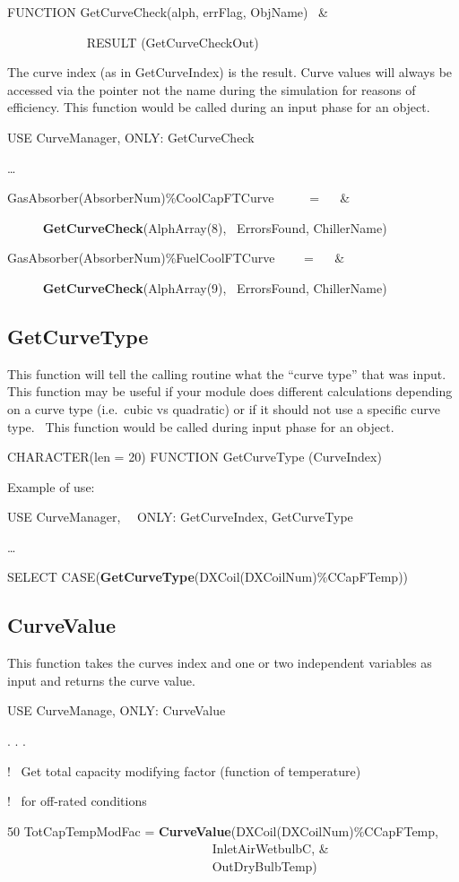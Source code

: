 FUNCTION GetCurveCheck(alph, errFlag, ObjName)~ \&

~~~~~~~~~~~~ RESULT (GetCurveCheckOut)

The curve index (as in GetCurveIndex) is the result. Curve values will always be accessed via the pointer not the name during the simulation for reasons of efficiency. This function would be called during an input phase for an object.

USE CurveManager, ONLY: GetCurveCheck

\ldots{}

GasAbsorber(AbsorberNum)\%CoolCapFTCurve~~~~~ = ~~ \&

~~~~~ \textbf{GetCurveCheck}(AlphArray(8),~ ErrorsFound, ChillerName)

GasAbsorber(AbsorberNum)\%FuelCoolFTCurve~~~~ = ~~ \&

~~~~~ \textbf{GetCurveCheck}(AlphArray(9),~ ErrorsFound, ChillerName)

\subsection{GetCurveType}\label{getcurvetype}

This function will tell the calling routine what the ``curve type'' that was input.~ This function may be useful if your module does different calculations depending on a curve type (i.e.~cubic vs quadratic) or if it should not use a specific curve type.~ This function would be called during input phase for an object.

CHARACTER(len = 20) FUNCTION GetCurveType (CurveIndex)

Example of use:

USE CurveManager,~~ ONLY: GetCurveIndex, GetCurveType

\ldots{}

SELECT CASE(\textbf{GetCurveType}(DXCoil(DXCoilNum)\%CCapFTemp))

\subsection{CurveValue}\label{curvevalue}

This function takes the curves index and one or two independent variables as input and returns the curve value.

USE CurveManage, ONLY: CurveValue

. . .

!~ Get total capacity modifying factor (function of temperature)

!~ for off-rated conditions

50 TotCapTempModFac = \textbf{CurveValue}(DXCoil(DXCoilNum)\%CCapFTemp, ~~~~~~~~~~~~~~~~~~~~~~~~~~~~~~~~ InletAirWetbulbC, \& ~~~~~~~~~~~~~~~~~~~~~~~~~~~~~~~~ OutDryBulbTemp)
